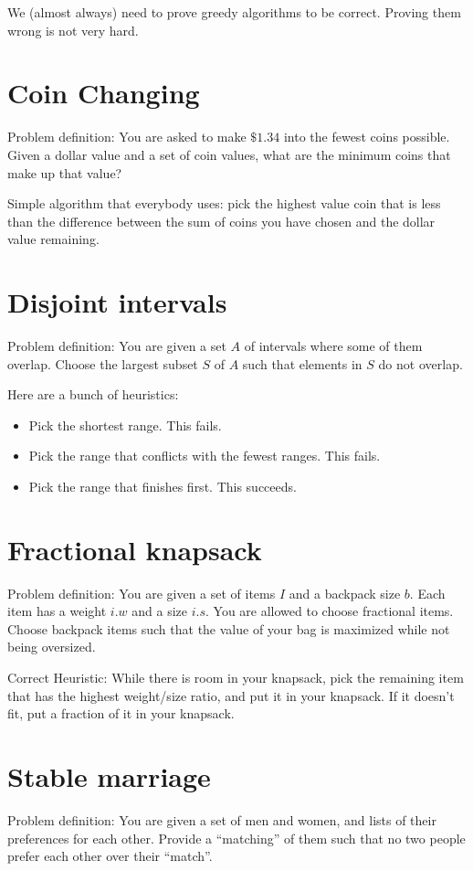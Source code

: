     We (almost always) need to prove greedy algorithms to be correct. Proving
    them wrong is not very hard.

    \section{Coin Changing}
        Problem definition: You are asked to make $\$1.34$ into the fewest coins
        possible. Given a dollar value and a set of coin values, what are the
        minimum coins that make up that value?

        Simple algorithm that everybody uses: pick the highest value coin that
        is less than the difference between the sum of coins you have chosen and
        the dollar value remaining.
    \section{Disjoint intervals}
        Problem definition: You are given a set $A$ of intervals where some of
        them overlap. Choose the largest subset $S$ of $A$ such that elements in
        $S$ do not overlap.

        Here are a bunch of heuristics:
        \begin{itemize}
            \item Pick the shortest range. This fails.
            \item Pick the range that conflicts with the fewest ranges. This fails.
            \item Pick the range that finishes first. This succeeds.
        \end{itemize}

    \section{Fractional knapsack}
        Problem definition: You are given a set of items $I$ and a backpack size
        $b$. Each item has a weight $i.w$ and a size $i.s$. You are allowed to
        choose fractional items. Choose backpack items such that the value of
        your bag is maximized while not being oversized.

        Correct Heuristic: While there is room in your knapsack, pick the
        remaining item that has the highest weight/size ratio, and put it in
        your knapsack. If it doesn't fit, put a fraction of it in your knapsack.

    \section{Stable marriage}
        Problem definition: You are given a set of men and women, and lists of
        their preferences for each other. Provide a ``matching'' of them such
        that no two people prefer each other over their ``match''.

